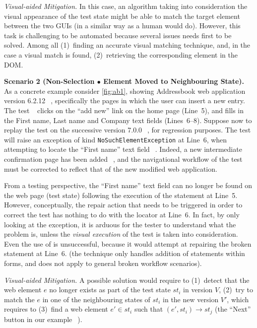 \noindent
\textit{Visual-aided Mitigation.}
In this case, an algorithm taking into consideration the visual appearance of the test state might be able to match the target element between the two GUIs (in a similar way as a human would do). However, this task is challenging to be automated because several issues needs first to be solved. Among all (1)~finding an accurate visual matching technique, and, in the case a visual match is found, (2)~retrieving the corresponding element in the DOM. 

\noindent
\textbf{Scenario 2 (Non-Selection $\bullet$ Element Moved to Neighbouring State).}
As a concrete example consider \autoref{fig:ab1}, showing Addressbook web application version 6.2.12~\textcircled{}, specifically the pages in which the user can insert a new entry. The test~\textcircled{} clicks on the ``add new'' link on the home page (Line~5), and fills in the First name, Last name and Company text fields (Lines~6--8).
Suppose now to replay the test on the successive version 7.0.0~\textcircled{}, for regression purposes. The test will raise an exception of kind \texttt{NoSuchElementException} at Line~6, when attempting to locate the ``First name'' text field~\textcircled{}. 
Indeed, a new intermediate confirmation page has been added~\textcircled{}, and the navigational workflow of the test must be corrected to reflect that of the new modified web application.

From a testing perspective, the ``First name'' text field can no longer be found on the web page (test state) following the execution of the statement at Line~5. However, conceptually, the repair action that needs to be triggered in order to correct the test has nothing to do with the locator at Line~6.
In fact, by only looking at the exception, it is arduous for the tester to understand what the problem is, unless the \textit{visual execution} of the test is taken into consideration.
%
Even the use of \water is unsuccessful, because it would attempt at repairing the broken statement at Line~6. (the technique only handles addition of statements within forms, and does not apply to general broken workflow scenarios).

\noindent
\textit{Visual-aided Mitigation.}
A possible solution would require to (1)~detect that the web element $e$ no longer exists as part of the test state $st_i$ in version $V$, (2)~try to match the $e$ in one of the neighbouring states of $st_i$ in the new version $V'$, which requires to (3)~find  a web element $e' \in st_i$ such that $(e', st_i) \rightarrow st_j$ (the ``Next'' button in our example~\textcircled{}).

